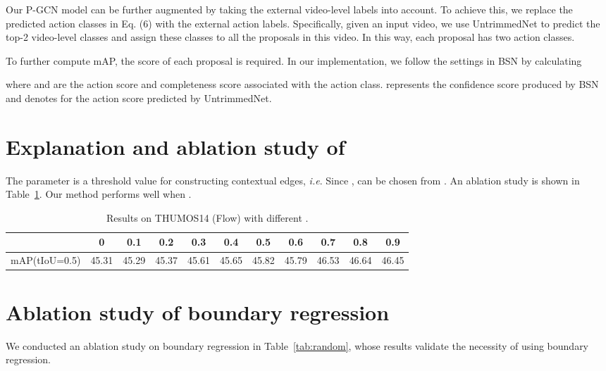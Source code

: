 \documentclass[10pt,twocolumn,letterpaper]{article}
\def\ie{\emph{i.e}\onedot} \def\Ie{\emph{I.e}\onedot}
\begin{document}
Our P-GCN model can be further augmented by taking the external video-level labels into account. To achieve this, we replace the predicted action classes in Eq. (6) with the external action labels. Specifically, given an input video, we use UntrimmedNet to predict the top-2 video-level classes and assign these classes to all the proposals in this video. In this way, each proposal has two action classes.

To further compute mAP, the score of each proposal is required. In our implementation, we follow the settings in BSN by calculating

where  and  are the action score and completeness score associated with the action class.
 represents the confidence score produced by BSN
and  denotes for the action score predicted by UntrimmedNet.


\section{Explanation and ablation study of }
The parameter  is a threshold value for constructing contextual edges, \ie . Since ,  can be chosen from .   
An ablation study is shown in Table~\ref{tab:theta}. Our method performs well when .


\begin{table}[!h]
\footnotesize
	\centering
	\tabcolsep 4pt \caption{\scriptsize{Results on THUMOS14 (Flow) with different }.}
	\scalebox{0.75}
	{
		\begin{tabular}{c|cccccccccc}
			\hline
			 & 0    & 0.1    & 0.2    & 0.3     & 0.4 & 0.5    & 0.6    & 0.7    & 0.8     & 0.9  \\ \hline
			mAP(tIoU=0.5) &
			45.31 & 45.29  & 45.37  & 45.61  & 45.65
			& 45.82  & 45.79  & 46.53  & 46.64   & 46.45 \\ \hline
		\end{tabular}
	}
	\label{tab:theta}
\end{table}











\section{Ablation study of boundary regression}
We conducted an ablation study on boundary regression in Table~\ref{tab:random}, whose results validate the necessity of using boundary regression.
\end{document}
